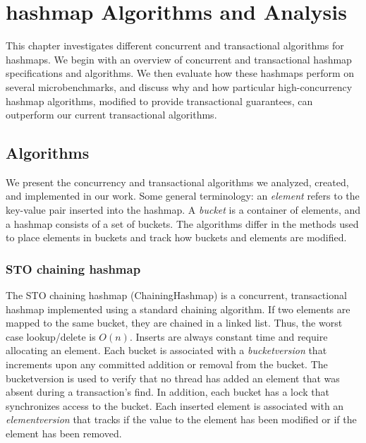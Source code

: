 \chapter{hashmap Algorithms and Analysis}
\label{hashmap}

This chapter investigates different concurrent and transactional algorithms for hashmaps. We begin with an overview of concurrent and transactional hashmap specifications and algorithms. We then evaluate how these hashmaps perform on several microbenchmarks, and discuss why and how particular high-concurrency hashmap algorithms, modified to provide transactional guarantees, can outperform our current transactional algorithms.

\section{Algorithms}

We present the concurrency and transactional algorithms we analyzed, created, and implemented in our work. Some general terminology: an \emph{element} refers to the key-value pair inserted into the hashmap. A \emph{bucket} is a container of elements, and a hashmap consists of a set of buckets. The algorithms differ in the methods used to place elements in buckets and track how buckets and elements are modified.

\subsection{STO chaining hashmap}
The STO chaining hashmap (ChainingHashmap) is a concurrent, transactional hashmap implemented using a standard chaining algorithm. If two elements are mapped to the same bucket, they are chained in a linked list. Thus, the worst case lookup/delete is $O(n)$. Inserts are always constant time and require allocating an element. Each bucket is associated with a \emph{bucketversion} that increments upon any committed addition or removal from the bucket. The bucketversion is used to verify that no thread has added an element that was absent during a transaction's find. In addition, each bucket has a lock that synchronizes access to the bucket. Each inserted element is associated with an \emph{elementversion} that tracks if the value to the element has been modified or if the element has been removed.

